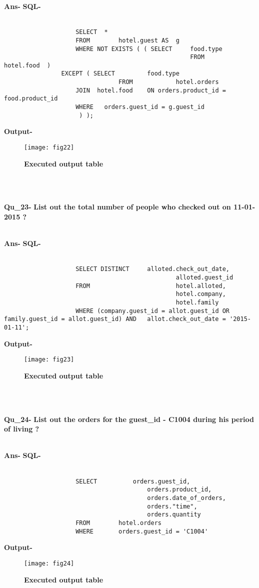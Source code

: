 \documentclass[a4,12pt]{report}
\begin{document}
\textbf{Ans-}		\textbf{SQL-} \\\
\begin{lstlisting}
					SELECT 	* 
					FROM		hotel.guest AS  g
					WHERE NOT EXISTS ( ( SELECT		food.type 
													FROM		hotel.food  ) 
				EXCEPT ( SELECT			food.type 
								FROM			hotel.orders 
					JOIN  hotel.food	ON orders.product_id = food.product_id             
					WHERE	orders.guest_id = g.guest_id  
					 ) ); 
\end{lstlisting}					 
\textbf{Output-} \\			   
\begin{figure}[hbtp]
\centering
\texttt{[image: fig22]}
\caption{\textbf{{\color{red}Executed output table}}}
\end{figure}
\\\

\newpage
\textbf{Qu\_23-}  \textbf{List out the total number of people who checked out on 11-01-2015 ?} \\\

\textbf{Ans-}		\textbf{SQL-} \\\
\begin{lstlisting}
					SELECT DISTINCT		alloted.check_out_date, 
												alloted.guest_id
					FROM						hotel.alloted, 
												hotel.company,
												hotel.family
					WHERE (company.guest_id = allot.guest_id OR family.guest_id = allot.guest_id) AND 	allot.check_out_date = '2015-01-11';
\end{lstlisting}
\textbf{Output-} \\			   
\begin{figure}[hbtp]
\centering
\texttt{[image: fig23]}
\caption{\textbf{{\color{red}Executed output table}}}
\end{figure}
\\\


\textbf{Qu\_24-}  \textbf{List out the orders for the guest\_id - C1004 during his period of living ?} \\\

\textbf{Ans-}		\textbf{SQL-} \\\

\begin{lstlisting}
					SELECT			orders.guest_id, 
										orders.product_id,  
										orders.date_of_orders, 
										orders."time", 
										orders.quantity
					FROM		hotel.orders
					WHERE		orders.guest_id = 'C1004'
\end{lstlisting}						
\textbf{Output-} \\			   
\begin{figure}[hbtp]
\centering
\texttt{[image: fig24]}
\caption{\textbf{{\color{red}Executed output table}}}
\end{figure}
\\\
\end{document}
